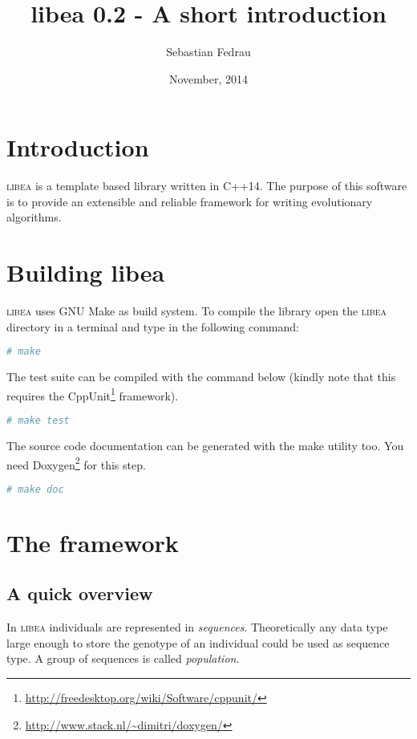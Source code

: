 \documentclass[a4paper]{article}
\title{libea 0.2 - A short introduction}
\author{Sebastian Fedrau}
\date{November, 2014}
\begin{document}
\maketitle

\newpage

\section{Introduction}

\textsc{libea} is a template based library written in C++14. The purpose of this software is to provide an extensible and reliable framework for writing evolutionary algorithms.

\section{Building libea}

\textsc{libea} uses GNU Make as build system. To compile the library open the \textsc{libea} directory in a terminal and type in the following command:

\begin{lstlisting}[language=bash, numbers=none]
# make
\end{lstlisting}

The test suite can be compiled with the command below (kindly note that this requires the CppUnit\footnote[1]{\url{http://freedesktop.org/wiki/Software/cppunit/}} framework).

\begin{lstlisting}[language=bash, numbers=none]
# make test
\end{lstlisting}

The source code documentation can be generated with the make utility too. You need Doxygen\footnote[2]{\url{http://www.stack.nl/~dimitri/doxygen/}} for this step.

\begin{lstlisting}[language=bash, numbers=none]
# make doc
\end{lstlisting}

\section{The framework}

\subsection{A quick overview}

In \textsc{libea} individuals are represented in \textit{sequences}. Theoretically any data type large enough to store the genotype of an individual could be used as sequence type. A group of sequences is called \textit{population}.
\end{document}
